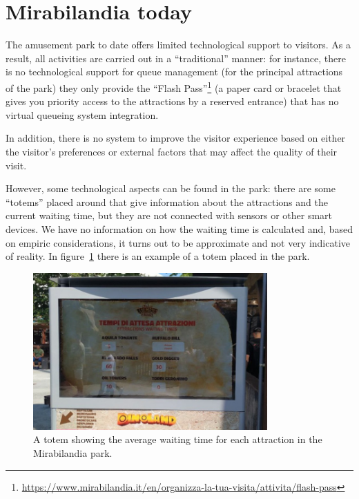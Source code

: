 \section{Mirabilandia today}\label{sec:mirabilandia-today}
The amusement park to date offers limited technological support to visitors.
As a result, all activities are carried out in a ``traditional'' manner:
for instance, there is no technological support for queue management (for the principal attractions of the park) they only provide the
``Flash Pass''\footnote{\url{https://www.mirabilandia.it/en/organizza-la-tua-visita/attivita/flash-pass}} (a paper card or bracelet that gives you
priority access to the attractions by a reserved entrance) that has no virtual queueing system integration.

In addition, there is no system to improve the visitor experience based on either the visitor's preferences or external factors that may affect the
quality of their visit.

However, some technological aspects can be found in the park:
there are some ``totems'' placed around that give information about the attractions and the current waiting time, but they are not connected with sensors or other smart devices.
We have no information on how the waiting time is calculated and, based on empiric considerations, it turns out to be approximate and not very indicative of reality.
In figure~\ref{fig:mira-totem} there is an example of a totem placed in the park.

\begin{figure}[H]
	\centering
	\includegraphics[width=0.8\textwidth]{img/mira-totem.jpg}
	\caption{A totem showing the average waiting time for each attraction in the Mirabilandia park.}
	\label{fig:mira-totem}
\end{figure}

